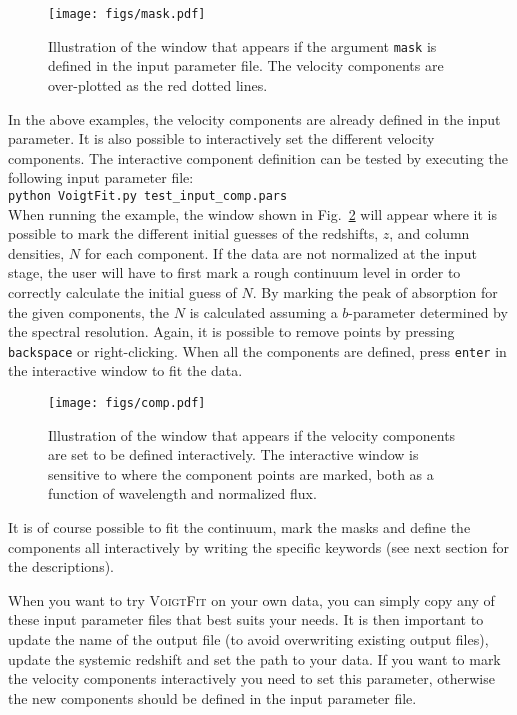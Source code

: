 \documentclass[a4paper]{article}
\begin{document}
\begin{figure} [!h]
	\centering
	\texttt{[image: figs/mask.pdf]}
	\caption{Illustration of the window that appears if the argument \texttt{mask} is defined in the input parameter file. The velocity components are over-plotted as the red dotted lines.  \label{fig:mask}}
\end{figure}

In the above examples, the velocity components are already defined in the input parameter. It is also possible to interactively set the different velocity components. The interactive component definition can be tested by executing the following input parameter file:\\

\texttt{python VoigtFit.py test\_input\_comp.pars} \\

\noindent
When running the example, the window shown in Fig.~\ref{fig:comp} will appear where it is possible to mark the different initial guesses of the redshifts, $z$, and column densities, $N$ for each component. If the data are not normalized at the input stage, the user will have to first mark a rough continuum level in order to correctly calculate the initial guess of $N$.
By marking the peak of absorption for the given components, the $N$ is calculated assuming a $b$-parameter determined by the spectral resolution.
Again, it is possible to remove points by pressing \texttt{backspace} or right-clicking. When all the components are defined, press \texttt{enter} in the interactive window to fit the data.

\begin{figure} [!ht]
	\centering
	\texttt{[image: figs/comp.pdf]}
	\caption{Illustration of the window that appears if the velocity components are set to be defined interactively. The interactive window is sensitive to where the component points are marked, both as a function of wavelength and normalized flux. \label{fig:comp}}
\end{figure}

It is of course possible to fit the continuum, mark the masks and define the components all interactively by writing the specific keywords (see next section for the descriptions).

When you want to try \textsc{VoigtFit} on your own data, you can simply copy any of these input parameter files that best suits your needs. It is then important to update the name of the output file (to avoid overwriting existing output files), update the systemic redshift and set the path to your data. If you want to mark the velocity components interactively you need to set this parameter, otherwise the new components should be defined in the input parameter file.\\
\end{document}
